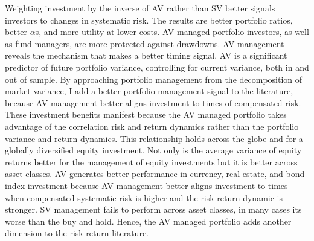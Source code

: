 Weighting investment by the inverse of AV rather than SV better signals investors to changes in systematic risk.
The results are better portfolio ratios, better $\alpha$s, and more utility at lower costs. AV managed portfolio investors, as well as fund managers, are more protected against drawdowns. AV management reveals the mechanism that makes a better timing signal. AV is a significant predictor of future portfolio variance, controlling for current variance, both in and out of sample. By approaching portfolio management from the decomposition of market variance, I add a better portfolio management signal to the literature, because AV management better aligns investment to times of compensated risk. These investment benefits manifest because the AV managed portfolio takes advantage of the correlation risk and return dynamics rather than the portfolio variance and return dynamics. This relationship holds across the globe and for a globally diversified equity investment. Not only is the average variance of equity returns better for the management of equity investments but it is better across asset classes. AV generates better performance in currency, real estate, and bond index investment because AV management better aligns investment to times when compensated systematic risk is higher and the risk-return dynamic is stronger. SV management fails to perform across asset classes, in many cases its worse than the buy and hold. Hence, the AV managed portfolio adds another dimension to the risk-return literature.

